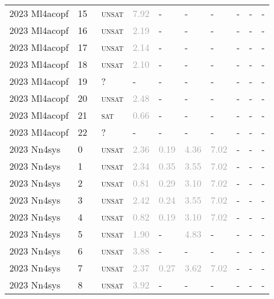 \begin{center}
{\begin{longtable}{@{}llllllllll@{}}
2023 Ml4acopf & 15 & ~\textsc{unsat} & \textcolor{darkgray}{7.92} & - & - & - & - & - & - \\
2023 Ml4acopf & 16 & ~\textsc{unsat} & \textcolor{darkgray}{2.19} & - & - & - & - & - & - \\
2023 Ml4acopf & 17 & ~\textsc{unsat} & \textcolor{darkgray}{2.14} & - & - & - & - & - & - \\
2023 Ml4acopf & 18 & ~\textsc{unsat} & \textcolor{darkgray}{2.10} & - & - & - & - & - & - \\
2023 Ml4acopf & 19 & ~? & - & - & - & - & - & - & - \\
2023 Ml4acopf & 20 & ~\textsc{unsat} & \textcolor{darkgray}{2.48} & - & - & - & - & - & - \\
2023 Ml4acopf & 21 & ~\textsc{sat} & \textcolor{darkgray}{0.66} & - & - & - & - & - & - \\
2023 Ml4acopf & 22 & ~? & - & - & - & - & - & - & - \\
\midrule
2023 Nn4sys & 0 & ~\textsc{unsat} & \textcolor{darkgray}{2.36} & \textcolor{darkgray}{0.19} & \textcolor{darkgray}{4.36} & \textcolor{darkgray}{7.02} & - & - & - \\
2023 Nn4sys & 1 & ~\textsc{unsat} & \textcolor{darkgray}{2.34} & \textcolor{darkgray}{0.35} & \textcolor{darkgray}{3.55} & \textcolor{darkgray}{7.02} & - & - & - \\
2023 Nn4sys & 2 & ~\textsc{unsat} & \textcolor{darkgray}{0.81} & \textcolor{darkgray}{0.29} & \textcolor{darkgray}{3.10} & \textcolor{darkgray}{7.02} & - & - & - \\
2023 Nn4sys & 3 & ~\textsc{unsat} & \textcolor{darkgray}{2.42} & \textcolor{darkgray}{0.24} & \textcolor{darkgray}{3.55} & \textcolor{darkgray}{7.02} & - & - & - \\
2023 Nn4sys & 4 & ~\textsc{unsat} & \textcolor{darkgray}{0.82} & \textcolor{darkgray}{0.19} & \textcolor{darkgray}{3.10} & \textcolor{darkgray}{7.02} & - & - & - \\
2023 Nn4sys & 5 & ~\textsc{unsat} & \textcolor{darkgray}{1.90} & - & \textcolor{darkgray}{4.83} & - & - & - & - \\
2023 Nn4sys & 6 & ~\textsc{unsat} & \textcolor{darkgray}{3.88} & - & - & - & - & - & - \\
2023 Nn4sys & 7 & ~\textsc{unsat} & \textcolor{darkgray}{2.37} & \textcolor{darkgray}{0.27} & \textcolor{darkgray}{3.62} & \textcolor{darkgray}{7.02} & - & - & - \\
2023 Nn4sys & 8 & ~\textsc{unsat} & \textcolor{darkgray}{3.92} & - & - & - & - & - & - \\

\end{longtable}}
\end{center}
